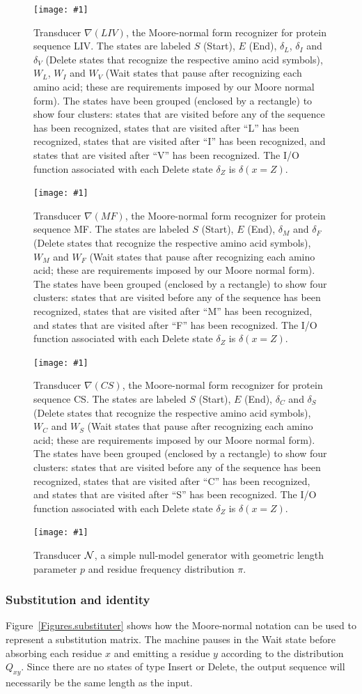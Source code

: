 \documentclass{article}
\newcommand{\figref}[1]{Figure~\ref{Figures.#1}}
\newcommand{\figlabel}[1]{\label{Figures.#1}}
\newcommand{\easyfig}[4]{
\begin{figure}
\texttt{[image: \#1]}
\caption{ \figlabel{#3} #4}
\end{figure}}
\newcommand{\pdffig}[2]{\easyfig{#1-fig.pdf}{}{#1}{#2}}
\newcommand{\widepdffig}[2]{\easyfig{#1-fig.pdf}{width=\textwidth}{#1}{#2}}
\newcommand\nullmodel{{\cal N}}
\newcommand\recognize{\nabla}
\begin{document}
\widepdffig{liv-labeled}{Transducer $\recognize(LIV)$, the Moore-normal form recognizer for protein sequence LIV.
The states are labeled $S$ (Start), $E$ (End),
$\delta_L$, $\delta_I$ and $\delta_V$ (Delete states that recognize the respective amino acid symbols),
$W_L$, $W_I$ and $W_V$ (Wait states that pause after recognizing each amino acid;
these are requirements imposed by our Moore normal form).
The states have been grouped (enclosed by a rectangle) to show four clusters:
 states that are visited before any of the sequence has been recognized,
 states that are visited after ``L'' has been recognized,
 states that are visited after ``I'' has been recognized,
and
 states that are visited after ``V'' has been recognized.
The I/O function associated with each Delete state $\delta_Z$ is $\delta(x=Z)$.}
\widepdffig{mf-labeled}{Transducer $\recognize(MF)$, the Moore-normal form recognizer for protein sequence MF.
The states are labeled $S$ (Start), $E$ (End),
$\delta_M$ and $\delta_F$ (Delete states that recognize the respective amino acid symbols),
$W_M$ and $W_F$ (Wait states that pause after recognizing each amino acid;
these are requirements imposed by our Moore normal form).
The states have been grouped (enclosed by a rectangle) to show four clusters:
 states that are visited before any of the sequence has been recognized,
 states that are visited after ``M'' has been recognized,
and
 states that are visited after ``F'' has been recognized.
The I/O function associated with each Delete state $\delta_Z$ is $\delta(x=Z)$.}
\widepdffig{cs-labeled}{Transducer $\recognize(CS)$, the Moore-normal form recognizer for protein sequence CS.
The states are labeled $S$ (Start), $E$ (End),
$\delta_C$ and $\delta_S$ (Delete states that recognize the respective amino acid symbols),
$W_C$ and $W_S$ (Wait states that pause after recognizing each amino acid;
these are requirements imposed by our Moore normal form).
The states have been grouped (enclosed by a rectangle) to show four clusters:
 states that are visited before any of the sequence has been recognized,
 states that are visited after ``C'' has been recognized,
and
 states that are visited after ``S'' has been recognized.
The I/O function associated with each Delete state $\delta_Z$ is $\delta(x=Z)$.}
\pdffig{null-model}{Transducer $\nullmodel$, a simple null-model generator with geometric length parameter $p$ and residue frequency distribution $\pi$.}

\subsubsection{Substitution and identity}
\figref{substituter} shows how the Moore-normal notation can be  used to represent a substitution matrix.  
The machine pauses in the Wait state before absorbing each residue $x$ and emitting a residue $y$
according to the distribution $Q_{xy}$.  
Since there are no states of type Insert or Delete, the output sequence will necessarily
be the same length as the input.  
\end{document}
